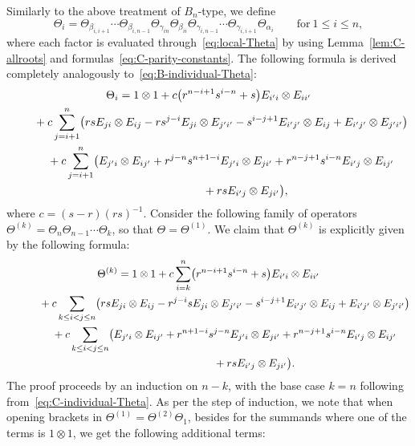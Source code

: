 \documentclass[pdftex]{sigma}
\numberwithin{equation}{section}
\begin{document}
Similarly to the above treatment of $B_{n}$-type, we define
\begin{displaymath}
 \Theta_{i} = \Theta_{\beta_{i,i + 1}}\cdots \Theta_{\beta_{i,n-1}}
 \Theta_{\gamma_{in}} \Theta_{\beta_{ii}}\Theta_{\gamma_{i,n-1}}\cdots \Theta_{\gamma_{i,i+1}}\Theta_{\alpha_{i}}
 \qquad \mathrm{for} \ 1\leq i\leq n,
\end{displaymath}
where each factor is evaluated through~\eqref{eq:local-Theta} by using Lemma~\ref{lem:C-allroots} and formulas~\eqref{eq:C-parity-constants}.
The following formula is derived completely analogously to~\eqref{eq:B-individual-Theta}:
\begin{gather}
 \Theta_{i} = 1 \otimes 1 + c\bigl(r^{n - i + 1}s^{i - n} + s\bigr) E_{i'i} \otimes E_{ii'} \nonumber\\
 \hphantom{\Theta_{i} =}{}
 + c\sum_{j = i + 1}^{n}\bigl(rsE_{ji} \otimes E_{ij} - rs^{j - i}E_{ji} \otimes E_{j'i'} - s^{i - j + 1}E_{i'j'} \otimes E_{ij} + E_{i'j'} \otimes E_{j'i'}\bigr)\nonumber \\
 \hphantom{\Theta_{i} =}{}
 + c\sum_{j = i + 1}^{n}\bigl(E_{j'i} \otimes E_{ij'} + r^{j - n}s^{n + 1 - i}E_{j'i} \otimes E_{ji'} + r^{n - j + 1}s^{i - n}E_{i'j} \otimes E_{ij'}\nonumber\\
 \hphantom{\Theta_{i} =+ c\sum_{j = i + 1}^{n}\bigl(}{}
 + rsE_{i'j} \otimes E_{ji'}\bigr),\label{eq:C-individual-Theta}
\end{gather}
where $c = (s - r)(rs)^{-1}$. Consider the following family of operators $\Theta^{(k)}=\Theta_n \Theta_{n-1} \cdots \Theta_{k}$, so that $\Theta=\Theta^{(1)}$. We claim that $\Theta^{(k)}$ is explicitly given by the following formula:
\begin{gather}
 \Theta^{(k)} = 1 \otimes 1 + c\sum_{i = k}^{n}\bigl(r^{n - i + 1}s^{i - n} + s\bigr)E_{i'i} \otimes E_{ii'} \nonumber \\
 \hphantom{\Theta^{(k)} =}{}
 + c\sum_{k \le i < j \le n}\bigl(rsE_{ji} \otimes E_{ij} - r^{j - i}sE_{ji} \otimes E_{j'i'} - s^{i - j + 1}E_{i'j'} \otimes E_{ij} + E_{i'j'} \otimes E_{j'i'}\bigr) \nonumber\\
 \hphantom{\Theta^{(k)} =}{}
 + c\sum_{k \le i < j \le n}\bigl(E_{j'i} \otimes E_{ij'} + r^{n + 1 - i}s^{j - n}E_{j'i} \otimes E_{ji'} + r^{n - j + 1}s^{i - n}E_{i'j} \otimes E_{ij'} \nonumber\\
 \hphantom{\Theta^{(k)} = + c\sum_{k \le i < j \le n}\bigl(}{}
 + rsE_{i'j} \otimes E_{ji'}\bigr).\label{eq:C-Theta_k}
\end{gather}
The proof proceeds by an induction on $n-k$, with the base case $k=n$ following from~\eqref{eq:C-individual-Theta}. As per the step of induction, we note that when opening brackets in $\Theta^{(1)}=\Theta^{(2)}\Theta_1$, besides for the summands where one of the terms is $1\otimes 1$, we get the following additional terms:
\end{document}
